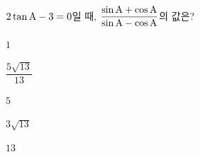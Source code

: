 $2\tan\mathrm{A}-3=0$일 때, $\dfrac{\sin\mathrm{A}+\cos\mathrm{A}}{\sin\mathrm{A}-\cos\mathrm{A}}$의 값은? 
\begin{choices32}{\rule[-3ex]{0pt}{8ex}$1$}{\rule[-3ex]{0pt}{8ex}$\dfrac{5\sqrt{13}}{13}$}{\rule[-3ex]{0pt}{8ex}$5$}{\rule[-3ex]{0pt}{8ex}$3\sqrt{13}$}{\rule[-3ex]{0pt}{8ex}$13$}\end{choices32}
